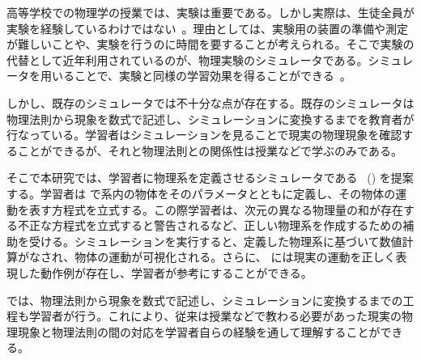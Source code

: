 高等学校での物理学の授業では、実験は重要である。しかし実際は、生徒全員が実験を経験しているわけではない~\cite{2015KJ00010038066}。理由としては、実験用の装置の準備や測定が難しいことや、実験を行うのに時間を要することが考えられる。そこで実験の代替として近年利用されているのが、物理実験のシミュレータである。シミュレータを用いることで、実験と同様の学習効果を得ることができる~\cite{ajredini_real_2014}。

しかし、既存のシミュレータでは不十分な点が存在する。既存のシミュレータは物理法則から現象を数式で記述し、シミュレーションに変換するまでを教育者が行なっている。学習者はシミュレーションを見ることで現実の物理現象を確認することができるが、それと物理法則との関係性は授業などで学ぶのみである。

そこで本研究では、学習者に物理系を定義させるシミュレータである \simname~(\simnamealt) を提案する。学習者は \simname で系内の物体をそのパラメータとともに定義し、その物体の運動を表す方程式を立式する。この際学習者は、次元の異なる物理量の和が存在する不正な方程式を立式すると警告されるなど、正しい物理系を作成するための補助を受ける。シミュレーションを実行すると、定義した物理系に基づいて数値計算がなされ、物体の運動が可視化される。さらに、 \simname には現実の運動を正しく表現した動作例が存在し、学習者が参考にすることができる。

\simname では、物理法則から現象を数式で記述し、シミュレーションに変換するまでの工程も学習者が行う。これにより、従来は授業などで教わる必要があった現実の物理現象と物理法則の間の対応を学習者自らの経験を通して理解することができる。
